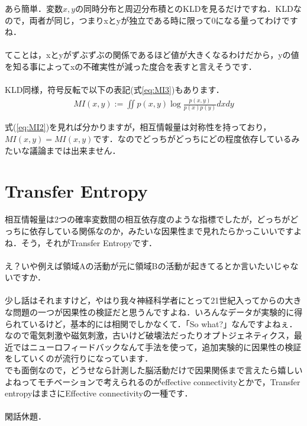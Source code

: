 \documentclass[11pt,a4paper]{ujreport}
\begin{document}
あら簡単．$変数x,y$の同時分布と周辺分布積とのKLDを見るだけですね．KLDなので，両者が同じ，つまりxとyが独立である時に限って0になる量ってわけですね．\\
\\

てことは，xとyがずぶずぶの関係であるほど値が大きくなるわけだから，yの値を知る事によってxの不確実性が減った度合を表すと言えそうです\cite{prml}．\\
\\

KLD同様，符号反転で以下の表記(式\ref{eq:MI3})もあります．
\begin{eqnarray}
\label{eq:MI3}
  MI(x,y) := \iint p(x,y) \log \frac{p(x,y)}{p(x)p(y)} dxdy
\end{eqnarray}

式(\ref{eq:MI2})を見れば分かりますが，相互情報量は対称性を持っており，$MI(x,y) = MI(x,y)$です．なのでどっちがどっちにどの程度依存しているみたいな議論までは出来ません．
\section{Transfer Entropy}
相互情報量は2つの確率変数間の相互依存度のような指標でしたが，どっちがどっちに依存している関係なのか，みたいな因果性まで見れたらかっこいいですよね．そう，それがTransfer Entropyです．\\
\\

え？いや例えば領域Aの活動が元に領域Bの活動が起きてるとか言いたいじゃないですか．\\
\\

少し話はそれますけど，やはり我々神経科学者にとって21世紀入ってからの大きな問題の一つが因果性の検証だと思うんですよね．いろんなデータが実験的に得られているけど，基本的には相関でしかなくて．「So what?」なんですよねぇ．なので電気刺激や磁気刺激，古いけど破壊法だったりオプトジェネティクス，最近ではニューロフィードバックなんて手法を使って，追加実験的に因果性の検証をしていくのが流行りになっています．\\

でも面倒なので，どうせなら計測した脳活動だけで因果関係まで言えたら嬉しいよねってモチベーションで考えられるのがeffective connectivityとかで，Transfer entropyはまさにEffective connectivityの一種です．\\
\\

閑話休題．\\
\\
\end{document}
